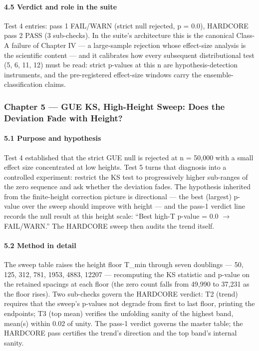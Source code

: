 \documentclass[10pt]{article}
\begin{document}
\paragraph{4.5 Verdict and role in the suite}

Test 4 entries: pass 1 FAIL/WARN (strict null rejected, p = 0.0), HARDCORE pass 2 PASS (3 sub-checks). In the suite's architecture this is the canonical Class-A failure of Chapter IV --- a large-sample rejection whose effect-size analysis is the scientific content --- and it calibrates how every subsequent distributional test (5, 6, 11, 12) must be read: strict p-values at this n are hypothesis-detection instruments, and the pre-registered effect-size windows carry the ensemble-classification claims.

\subsubsection{Chapter 5 --- GUE KS, High-Height Sweep: Does the Deviation Fade with Height?}

\paragraph{5.1 Purpose and hypothesis}

Test 4 established that the strict GUE null is rejected at n = 50,000 with a small effect size concentrated at low heights. Test 5 turns that diagnosis into a controlled experiment: restrict the KS test to progressively higher sub-ranges of the zero sequence and ask whether the deviation fades. The hypothesis inherited from the finite-height correction picture is directional --- the best (largest) p-value over the sweep should improve with height --- and the pass-1 verdict line records the null result at this height scale: ``Best high-T p-value = 0.0 $\rightarrow$ FAIL/WARN.'' The HARDCORE sweep then audits the trend itself.

\paragraph{5.2 Method in detail}

The sweep table raises the height floor T\_min through seven doublings --- 50, 125, 312, 781, 1953, 4883, 12207 --- recomputing the KS statistic and p-value on the retained spacings at each floor (the zero count falls from 49,990 to 37,231 as the floor rises). Two sub-checks govern the HARDCORE verdict: T2 (trend) requires that the sweep's p-values not degrade from first to last floor, printing the endpoints; T3 (top mean) verifies the unfolding sanity of the highest band, mean(s) within 0.02 of unity. The pass-1 verdict governs the master table; the HARDCORE pass certifies the trend's direction and the top band's internal sanity.
\end{document}

